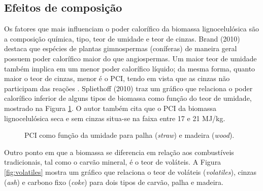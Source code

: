 \subsection{Efeitos de composição}
Os fatores que mais influenciam o poder calorífico da biomassa lignocelulósica são a composição química, tipo, teor de umidade e teor de cinzas. Brand (2010) destaca que espécies de plantas gimnospermas (coníferas) de maneira geral possuem poder calorífico maior do que angiospermas. Um maior teor de umidade também implica em um menor poder calorífico líquido; da mesma forma, quanto maior o teor de cinzas, menor é o PCI, tendo em vista que as cinzas não participam das reações \cite{Brand}. Spliethoff (2010) traz um gráfico que relaciona o poder calorífico inferior de alguns tipos de biomassa como função do teor de umidade, mostrado na Figura \ref{fig:PCIw}. O autor também cita que o PCI da biomassa lignocelulósica seca e sem cinzas situa-se na faixa entre 17 e 21 MJ/kg.
\begin{figure}
	\centering
	\caption{PCI como função da umidade para palha (\textit{straw}) e madeira (\textit{wood}).}
	\label{fig:PCIw}
\end{figure}

Outro ponto em que a biomassa se diferencia em relação aos combustíveis tradicionais, tal como o carvão mineral, é o teor de voláteis. A Figura \ref{fig:volatiles} mostra um gráfico que relaciona o teor de voláteis (\textit{volatiles}), cinzas (\textit{ash}) e carbono fixo (\textit{coke}) para dois tipos de carvão, palha e madeira.

